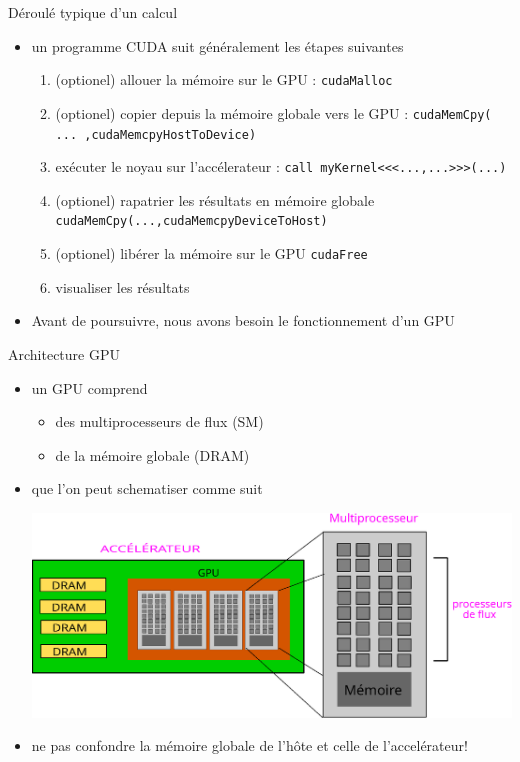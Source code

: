 \documentclass[11pt,mathserif]{beamer}
\newcommand{\scout}{\faAngellist}
\newcommand{\argi}{\faLightbulbO}
\newcommand{\kontuz}{\faExclamationTriangle}
\newcommand{\geldi}{\faHandPaperO}
\newif\ifC
\begin{document}
\begin{frame}{Déroulé typique d'un calcul}
  \lstset{basicstyle=\ttfamily}
\pause
  \begin{itemize}[<+->]
    \item[\argi] un programme CUDA suit généralement les étapes suivantes 
\begin{enumerate}[<+->]
 \item \ifC \else (optionel) \fi allouer la mémoire sur le GPU : \lstinline!cudaMalloc!
 \item \ifC \else (optionel) \fi copier depuis la mémoire globale vers le GPU : \lstinline!cudaMemCpy( ... ,cudaMemcpyHostToDevice)!
 \item exécuter le noyau sur l'accélerateur : \ifC \lstinline!myKernel<<<...,...>>>(...)! 
 \else \lstinline!call myKernel<<<...,...>>>(...)! \fi
 \item \ifC \else (optionel) \fi rapatrier les résultats en mémoire globale \lstinline!cudaMemCpy(...,cudaMemcpyDeviceToHost)!
 \item \ifC \else (optionel) \fi libérer la mémoire sur le GPU \lstinline!cudaFree!
 \item visualiser les résultats
\end{enumerate}
\item[\geldi] Avant de poursuivre, nous avons besoin le fonctionnement d'un GPU
\end{itemize}
\end{frame}
\begin{frame}{Architecture GPU}
\begin{itemize}[<+->]
  \item[\scout] un GPU comprend 
   \begin{itemize} 
     \item des multiprocesseurs de flux (SM)
     \item de la mémoire globale (DRAM)
   \end{itemize} 
  \item que l'on peut schematiser comme suit
  \begin{center}
    \includegraphics[width=0.8\linewidth]{fig/archi_gpu.eps}
  \end{center}
  \item[\kontuz] ne pas confondre la mémoire globale de l'hôte et celle de l'accelérateur!
\end{itemize}
\end{frame}
\end{document}
